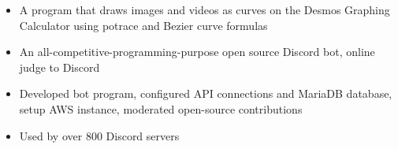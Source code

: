 \documentclass[10pt,a4paper,ragged2e,withhyper]{altacv}
\begin{document}
\begin{paracol}{2}
\divider

\begin{itemize}
\item A program that draws images and videos as curves on the Desmos Graphing Calculator using potrace and Bezier curve formulas
\end{itemize}

\divider



\newpage








\switchcolumn



\begin{itemize}
\item An all-competitive-programming-purpose open source Discord bot, online judge to Discord
\item Developed bot program, configured API connections and MariaDB database, setup AWS instance, moderated open-source contributions
\item Used by over 800 Discord servers
\end{itemize}


\end{paracol}
\end{document}

